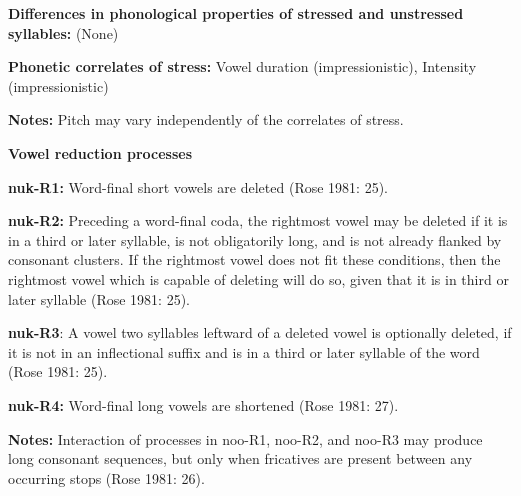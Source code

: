 \begin{styleBody}
\textbf{Differences in phonological properties of stressed and unstressed syllables:} (None)
\end{styleBody}

\begin{styleBody}
\textbf{Phonetic correlates of stress: }Vowel duration (impressionistic), Intensity (impressionistic)
\end{styleBody}

\begin{styleBody}
\textbf{Notes: }Pitch may vary independently of the correlates of stress.
\end{styleBody}

\begin{styleBody}
\textbf{Vowel reduction processes}
\end{styleBody}

\begin{styleBody}
\textbf{nuk-R1:} Word-final short vowels are deleted (Rose 1981: 25).
\end{styleBody}

\begin{styleBody}
\textbf{nuk-R2:} Preceding a word-final coda, the rightmost vowel may be deleted if it is in a third or later syllable, is not obligatorily long, and is not already flanked by consonant clusters. If the rightmost vowel does not fit these conditions, then the rightmost vowel which is capable of deleting will do so, given that it is in third or later syllable (Rose 1981: 25).
\end{styleBody}

\begin{styleBody}
\textbf{nuk-R3}: A vowel two syllables leftward of a deleted vowel is optionally deleted, if it is not in an inflectional suffix and is in a third or later syllable of the word (Rose 1981: 25).
\end{styleBody}

\begin{styleBody}
\textbf{nuk-R4:} Word-final long vowels are shortened (Rose 1981: 27).
\end{styleBody}

\begin{styleBody}
\textbf{Notes: }Interaction of processes in noo-R1, noo-R2, and noo-R3 may produce long consonant sequences, but only when fricatives are present between any occurring stops (Rose 1981: 26).
\end{styleBody}

